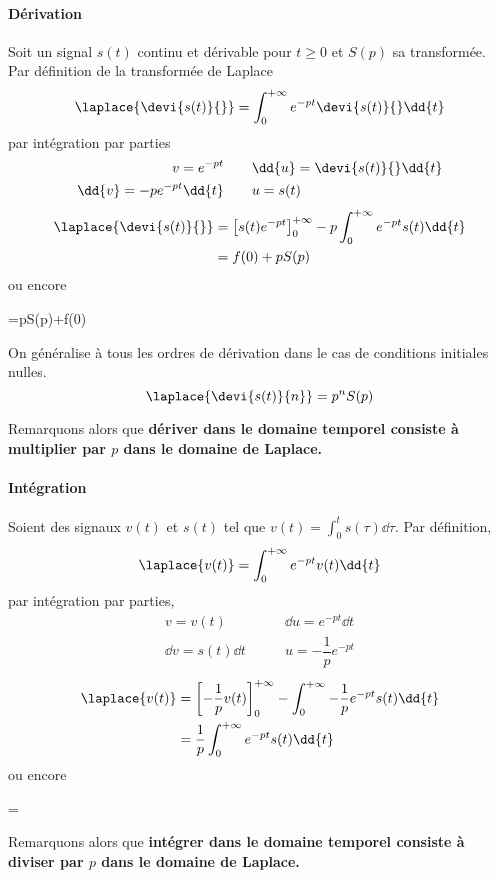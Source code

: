 \paragraph{Dérivation}
Soit un signal $s(t)$ continu et dérivable pour $t\ge0$ et $S(p)$ sa transformée.
Par définition de la transformée de Laplace 
$$
\laplace{\devi{s(t)}{}}=\int_{0}^{+\infty} e^{-pt}\devi{s(t)}{}\dd{t}
$$
par intégration par parties
\begin{align*}
    v=e^{-pt}\qquad&\dd{u}=\devi{s(t)}{}\dd{t}\\
    \dd{v}=-pe^{-pt}\dd{t}\qquad&u=s(t)
\end{align*}
\begin{align*}
    \laplace{\devi{s(t)}{}}&=\left[s(t)e^{-pt}\right]_0^{+\infty}-p\int_{0}^{+\infty} e^{-pt}s(t)\dd{t} \\
                           &=f(0)+pS(p)
\end{align*}
ou encore
\begin{bequation}
    =pS(p)+f(0)
\end{bequation}
On généralise à tous les ordres de dérivation dans le cas de conditions initiales nulles.
$$
\laplace{\devi{s(t)}{n}}=p^nS(p)
$$

Remarquons alors que \textbf{dériver dans le domaine temporel consiste à multiplier par 
$p$ dans le domaine de Laplace.}
\paragraph{Intégration}
Soient  des signaux $v(t)$ et $s(t)$ tel que $v(t)=\int_{0}^{t}s(\tau)\dd{\tau}$. 
Par définition,
$$
\laplace{v(t)}=\int_{0}^{+\infty} e^{-pt}v(t)\dd{t}
$$
par intégration par parties,
\begin{align*}
    v=v(t)\qquad&\dd{u}=e^{-pt}\dd{t}\\
    \dd{v}=s(t)\dd{t}\qquad&u=-\dfrac{1}{p}e^{-pt}
\end{align*} 
\begin{align*}
    \laplace{v(t)}&=\left[-\dfrac{1}{p}v(t)\right]_0^{+\infty}-\int_{0}^{+\infty} -\dfrac{1}{p}e^{-pt}s(t)\dd{t} \\
    &=\dfrac{1}{p}\int_{0}^{+\infty} e^{-pt}s(t)\dd{t}       
\end{align*}
ou encore
\begin{bequation}
    =
\end{bequation}
Remarquons alors que \textbf{intégrer dans le domaine temporel consiste à diviser par $p$ 
dans le domaine de Laplace.}


